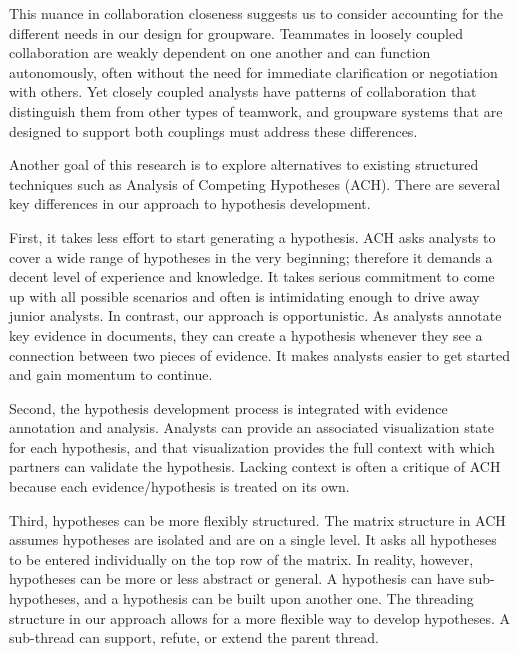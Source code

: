 This nuance in collaboration closeness suggests us to consider accounting for the different needs in our design for groupware. Teammates in loosely coupled collaboration are weakly dependent on one another and can function autonomously, often without the need for immediate clarification or negotiation with others. Yet closely coupled analysts have patterns of collaboration that distinguish them from other types of teamwork, and groupware systems that are designed to support both couplings must address these differences. 



Another goal of this research is to explore alternatives to existing structured techniques such as Analysis of Competing Hypotheses (ACH). There are several key differences in our approach to hypothesis development.

First, it takes less effort to start generating a hypothesis. ACH asks analysts to cover a wide range of hypotheses in the very beginning; therefore it demands a decent level of experience and knowledge. It takes serious commitment to come up with all possible scenarios and often is intimidating enough to drive away junior analysts. In contrast, our approach is opportunistic. As analysts annotate key evidence in documents, they can create a hypothesis whenever they see a connection between two pieces of evidence. It makes analysts easier to get started and gain momentum to continue.

Second, the hypothesis development process is integrated with evidence annotation and analysis. Analysts can provide an associated visualization state for each hypothesis, and that visualization provides the full context with which partners can validate the hypothesis. Lacking context is often a critique of ACH \citep{Gelder2008} because each evidence/hypothesis is treated on its own. 

Third, hypotheses can be more flexibly structured. The matrix structure in ACH assumes hypotheses are isolated and are on a single level. It asks all hypotheses to be entered individually on the top row of the matrix. In reality, however, hypotheses can be more or less abstract or general. A hypothesis can have sub-hypotheses, and a hypothesis can be built upon another one. The threading structure in our approach allows for a more flexible way to develop hypotheses. A sub-thread can support, refute, or extend the parent thread. 

